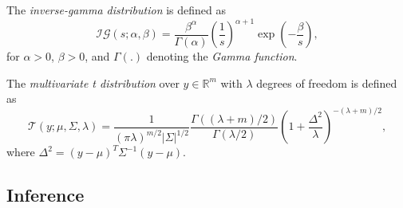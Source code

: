 \documentclass{mldsmsc}
\begin{document}
\begin{definition}
    The \textit{inverse-gamma distribution} is defined as
    \begin{equation}
        \mathcal{IG}(s; \alpha, \beta) = \frac{\beta ^ \alpha}{\Gamma(\alpha)} \left(\frac{1}{s}\right)^{\alpha + 1} \exp \left(-\frac{\beta}{s}\right),
    \end{equation}
    for $\alpha > 0$, $\beta > 0$, and $\Gamma(.)$ denoting the \textit{Gamma function}.
\end{definition}

\begin{definition}
    The \textit{multivariate t distribution} over $y \in \mathbb{R}^{m}$ with $\lambda$ degrees of freedom is defined as
    \begin{equation}
        \mathcal{T}(y; \mu, \Sigma, \lambda) = \frac{1}{(\pi \lambda)^{m/2} |\Sigma|^{1/2}} \frac{\Gamma((\lambda + m)/2)}{\Gamma(\lambda / 2)} \left(1 + \frac{\Delta^2}{\lambda}\right)^{-(\lambda + m) / 2},
    \end{equation}
    where $\Delta^2 = (y - \mu)^T \Sigma^{-1} (y-\mu)$.
\end{definition}

\subsection{Inference}
\end{document}
